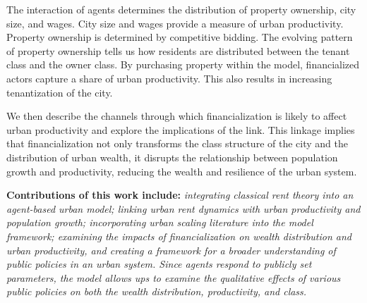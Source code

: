 The interaction of agents determines the distribution of property ownership,  city size, and wages. City size and wages provide a measure of urban productivity. Property ownership is determined by competitive bidding. The evolving pattern of property ownership tells us how residents are distributed between the tenant class and the owner class. %
By purchasing property within the model, financialized actors capture a share of urban productivity. %
This also results in increasing tenantization of the city. 



We then describe the channels through which financialization is likely to affect urban productivity and explore the implications of the link. %
This linkage implies that financialization not only transforms the class structure of the city and the distribution of urban wealth, it disrupts the relationship between population growth and productivity, reducing the wealth and resilience of the urban system. 

\textbf{Contributions of this work include:} \textit{integrating classical rent theory into an agent-based urban model; linking urban rent dynamics with urban productivity and population growth; incorporating urban scaling literature into the model framework; examining the impacts of financialization on wealth distribution and urban productivity, and creating a framework for a broader understanding of public policies in an urban system. Since agents respond to publicly set parameters, the model allows ups to examine the qualitative effects of  various public policies on both the wealth distribution, productivity, and class.}


